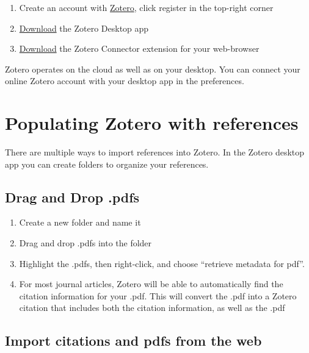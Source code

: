 \documentclass[]{book}
\providecommand{\tightlist}{%
  \setlength{\itemsep}{0pt}\setlength{\parskip}{0pt}}
\theoremstyle{definition}
\theoremstyle{definition}
\theoremstyle{definition}
\theoremstyle{remark}
\begin{document}
\begin{enumerate}
\def\labelenumi{\arabic{enumi}.}
\tightlist
\item
  Create an account with \href{https://www.zotero.org}{Zotero}, click
  register in the top-right corner
\item
  \href{https://www.zotero.org/download/}{Download} the Zotero Desktop
  app
\item
  \href{https://www.zotero.org/download/}{Download} the Zotero Connector
  extension for your web-browser
\end{enumerate}

Zotero operates on the cloud as well as on your desktop. You can connect
your online Zotero account with your desktop app in the preferences.

\section{Populating Zotero with
references}\label{populating-zotero-with-references}

There are multiple ways to import references into Zotero. In the Zotero
desktop app you can create folders to organize your references.

\subsection{Drag and Drop .pdfs}\label{drag-and-drop-.pdfs}

\begin{enumerate}
\def\labelenumi{\arabic{enumi}.}
\tightlist
\item
  Create a new folder and name it
\item
  Drag and drop .pdfs into the folder
\item
  Highlight the .pdfs, then right-click, and choose ``retrieve metadata
  for pdf''.
\item
  For most journal articles, Zotero will be able to automatically find
  the citation information for your .pdf. This will convert the .pdf
  into a Zotero citation that includes both the citation information, as
  well as the .pdf
\end{enumerate}

\subsection{Import citations and pdfs from the
web}\label{import-citations-and-pdfs-from-the-web}
\end{document}
